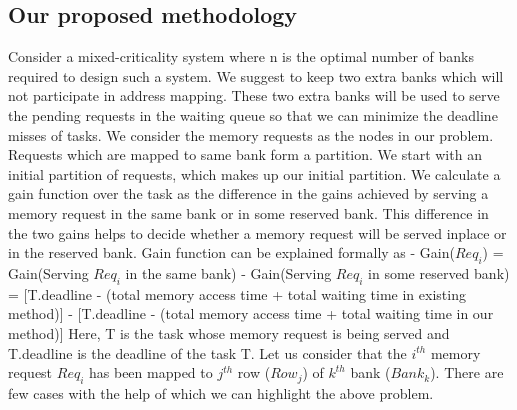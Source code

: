 \subsection{Our proposed methodology}\label{mfm}
\noindent
Consider a mixed-criticality system where n is the optimal number of banks required to design such a system. We suggest to 
keep two extra banks which will not participate in address mapping. These two extra banks will be used to serve the pending 
requests in the waiting queue so that we can minimize the deadline misses of tasks. We consider the memory requests as the 
nodes in our problem. Requests which are mapped to same bank form a partition. We start with an initial partition of 
requests, which makes up our initial partition. We calculate a gain function over the task as the difference in the gains 
achieved by serving a memory request in the same bank or in some reserved bank. This difference in the two gains helps to 
decide whether a memory request will be served inplace or in the reserved bank. Gain function can be explained formally as -
\newline
\newline
Gain($Req_{i}$) = Gain(Serving $Req_{i}$ in the same bank) - Gain(Serving $Req_{i}$ in some reserved bank)
\newline
\newline
= [T.deadline - (total memory access time + total waiting time in existing method)] - [T.deadline - (total memory access time 
+ total waiting time in our method)]
\newline
\newline
Here, T is the task whose memory request is being served and T.deadline is the deadline of the task T.
Let us consider that the $i^{th}$ memory request $Req_{i}$ has been mapped to $j^{th}$ row ($Row_{j}$) of $k^{th}$ bank 
($Bank_{k}$). There are few cases with the help of which we can highlight the above problem.
